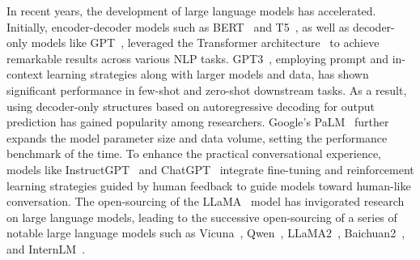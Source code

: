 \documentclass[10pt,twocolumn,letterpaper]{article}
\begin{document}
In recent years, the development of large language models has accelerated. Initially, encoder-decoder models such as BERT~\cite{devlin2018bert} and T5~\cite{raffel2020exploring}, as well as decoder-only models like GPT~\cite{radford2018improving}, leveraged the Transformer architecture~\cite{vaswani2017attention} to achieve remarkable results across various NLP tasks. GPT3~\cite{brown2020language}, employing prompt and in-context learning strategies along with larger models and data, has shown significant performance in few-shot and zero-shot downstream tasks. As a result, using decoder-only structures based on autoregressive decoding for output prediction has gained popularity among researchers. Google's PaLM~\cite{chowdhery2022palm} further expands the model parameter size and data volume, setting the performance benchmark of the time. To enhance the practical conversational experience, models like InstructGPT~\cite{ouyang2022training} and ChatGPT~\cite{openai2020chatgpt} integrate fine-tuning and reinforcement learning strategies guided by human feedback to guide models toward human-like conversation. The open-sourcing of the LLaMA~\cite{touvron2023llama} model has invigorated research on large language models, leading to the successive open-sourcing of a series of notable large language models such as Vicuna~\cite{vicuna2023}, Qwen~\cite{qwen7b}, LLaMA2~\cite{touvron2023llama2}, Baichuan2~\cite{baichuan2023baichuan2}, and InternLM~\cite{2023internlm}.
\end{document}
